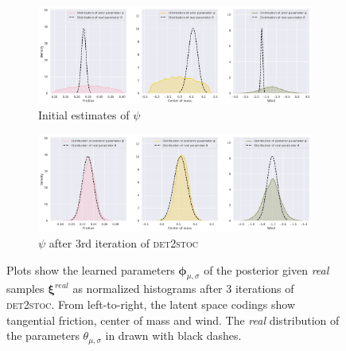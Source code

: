 \documentclass{kththesis}
\newcommand{\vph}{\boldsymbol{\phi}}
\newcommand{\vpsi}{\vec{\psi}}
\renewcommand{\vec}[1]{\boldsymbol{#1}}
\newcommand{\dettostoc}{\textsc{det2stoc}}
\begin{document}
\begin{figure}

\centering
\captionsetup{size=footnotesize}
\begin{subfigure}{\linewidth}
  \includegraphics[width=1.0\linewidth]{img/windyslope/latent-representation/new/iter0}
  \caption{Initial estimates of $\psi$}
  \label{fig_3_parameters_0}
\end{subfigure}
\begin{subfigure}{\linewidth}
  \includegraphics[width=1.0\linewidth]{img/windyslope/latent-representation/new/latent_encoding_iter3}
  \caption{$\psi$ after 3rd iteration of \dettostoc{}}
\end{subfigure}
\caption{Plots show the learned parameters $\vph_{\mu, \sigma}$ of the posterior given \emph{real} samples $\vec{\xi}^{real}$ as normalized histograms after 3 iterations of \dettostoc{}.
From left-to-right, the latent space codings show tangential friction, center of mass and wind. %
The \emph{real} distribution of the parameters $\theta_{\mu, \sigma}$ in drawn with black dashes.}
\label{fig:windyslope_latent_space}

\end{figure}
\end{document}
